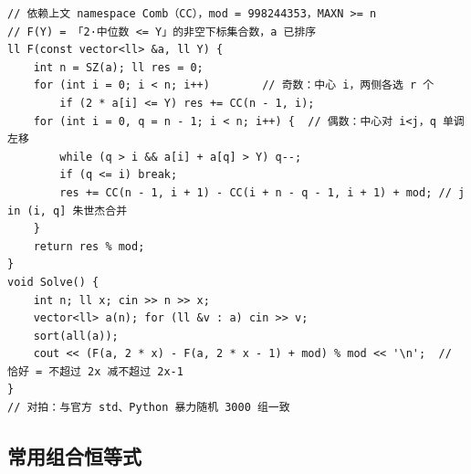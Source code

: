 		\begin{verbatim}
// 依赖上文 namespace Comb（CC），mod = 998244353，MAXN >= n
// F(Y) = 「2·中位数 <= Y」的非空下标集合数，a 已排序
ll F(const vector<ll> &a, ll Y) {
	int n = SZ(a); ll res = 0;
	for (int i = 0; i < n; i++)        // 奇数：中心 i，两侧各选 r 个
		if (2 * a[i] <= Y) res += CC(n - 1, i);
	for (int i = 0, q = n - 1; i < n; i++) {  // 偶数：中心对 i<j，q 单调左移
		while (q > i && a[i] + a[q] > Y) q--;
		if (q <= i) break;
		res += CC(n - 1, i + 1) - CC(i + n - q - 1, i + 1) + mod; // j in (i, q] 朱世杰合并
	}
	return res % mod;
}
void Solve() {
	int n; ll x; cin >> n >> x;
	vector<ll> a(n); for (ll &v : a) cin >> v;
	sort(all(a));
	cout << (F(a, 2 * x) - F(a, 2 * x - 1) + mod) % mod << '\n';  // 恰好 = 不超过 2x 减不超过 2x-1
}
// 对拍：与官方 std、Python 暴力随机 3000 组一致
		\end{verbatim}

		\subsection{常用组合恒等式}


